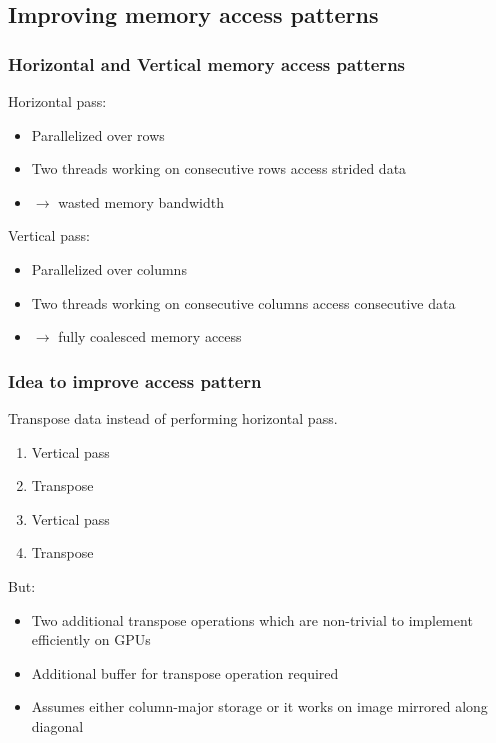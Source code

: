 \documentclass{beamer}
\begin{document}
\subsection{Improving memory access patterns}
\begin{frame}[fragile]
  \frametitle{Horizontal and Vertical memory access patterns}
  Horizontal pass:
  \begin{itemize}
    \item Parallelized over rows
    \item Two threads working on consecutive rows access strided data
    \item $\to$ wasted memory bandwidth
  \end{itemize}

  Vertical pass:
  \begin{itemize}
    \item Parallelized over columns
    \item Two threads working on consecutive columns access consecutive data
    \item $\to$ fully coalesced memory access
  \end{itemize}
\end{frame}

\begin{frame}[fragile]
  \frametitle{Idea to improve access pattern}
  Transpose data instead of performing horizontal pass.
  \begin{enumerate}
    \item Vertical pass
    \item Transpose
    \item Vertical pass
    \item Transpose
  \end{enumerate}
  But:
  \begin{itemize}
    \item Two additional transpose operations which are non-trivial to
      implement efficiently on GPUs
    \item Additional buffer for transpose operation required
    \item Assumes either column-major storage or it works on image mirrored
      along diagonal
  \end{itemize}
\end{frame}
\end{document}
